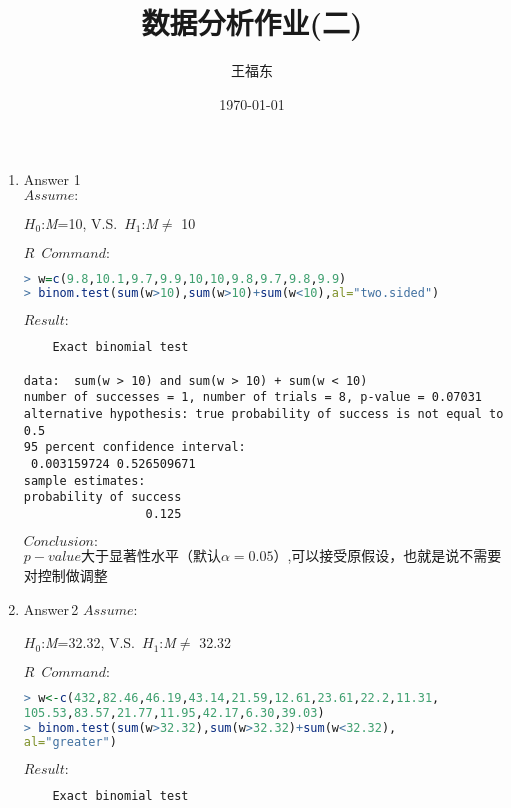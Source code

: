 \documentclass[UTF8,a4paper]{ctexart}
\title{数据分析作业(二)}
\author{王福东}
\date{\today}
\begin{document}
\maketitle
\begin{enumerate}
\item Answer 1 \\
{\color{yellow} \large \textbf{$Assume:$}}\\
\begin{center}
\emph{$H_0$}:\emph{M}=10,\,\,V.S.\,\,\,\emph{$H_1$}:\emph{M}$\neq$ 10
\end{center}
{\color{blue} \large \textbf{$R\,\,\, Command:$}}\\

\begin{lstlisting}[language=R]
> w=c(9.8,10.1,9.7,9.9,10,10,9.8,9.7,9.8,9.9)
> binom.test(sum(w>10),sum(w>10)+sum(w<10),al="two.sided")
\end{lstlisting}
{\color{red} \large \textbf{$ Result:$}}\\

\begin{verbatim}
	Exact binomial test

data:  sum(w > 10) and sum(w > 10) + sum(w < 10)
number of successes = 1, number of trials = 8, p-value = 0.07031
alternative hypothesis: true probability of success is not equal to 0.5
95 percent confidence interval:
 0.003159724 0.526509671
sample estimates:
probability of success 
                 0.125 

\end{verbatim}

\textcolor[rgb]{0.28,0.9,0.8} {\large \textbf{$ Conclusion:$}}\\
$p-value$大于显著性水平（默认$\alpha =0.05$）,可以接受原假设，也就是说不需要对控制做调整

\item Answer\,2
{\color{yellow} \large \textbf{$Assume:$}}\\
\begin{center}
\emph{$H_0$}:\emph{M}=32.32,\,\,V.S.\,\,\,\emph{$H_1$}:\emph{M}$\neq$ 32.32
\end{center}
{\color{blue} \large \textbf{$R\,\,\, Command:$}}\\
\begin{lstlisting}[language=R]
> w<-c(432,82.46,46.19,43.14,21.59,12.61,23.61,22.2,11.31,
105.53,83.57,21.77,11.95,42.17,6.30,39.03)
> binom.test(sum(w>32.32),sum(w>32.32)+sum(w<32.32),
al="greater")
\end{lstlisting}
{\color{red} \large \textbf{$ Result:$}}\\
\begin{verbatim}
	Exact binomial test


\end{verbatim}
\end{enumerate}
\end{document}

